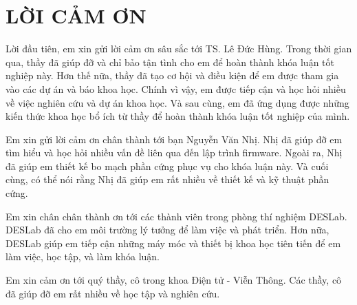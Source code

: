 \chapter*{LỜI CẢM ƠN}
\label{thanks}

Lời đầu tiên, em xin gửi lời cảm ơn sâu sắc tới TS. Lê Đức Hùng. Trong thời gian qua, thầy đã giúp đỡ và chỉ bảo tận tình cho em để hoàn thành khóa luận tốt nghiệp này. Hơn thế nữa, thầy đã tạo cơ hội và điều kiện để em được tham gia vào các dự án và báo khoa học. Chính vì vậy, em được tiếp cận và học hỏi nhiều về việc nghiên cứu và dự án khoa học. Và sau cùng, em đã ứng dụng được những kiến thức khoa học bổ ích từ thầy để hoàn thành khóa luận tốt nghiệp của mình.

Em xin gửi lời cảm ơn chân thành tới bạn Nguyễn Văn Nhị. Nhị đã giúp đỡ em tìm hiểu và học hỏi nhiều vấn đề liên qua đến lập trình firmware. Ngoài ra, Nhị đã giúp em thiết kế bo mạch phần cứng phục vụ cho khóa luận này. Và cuối cùng, có thể nói rằng Nhị đã giúp em rất nhiều về thiết kế và kỹ thuật phần cứng.

Em xin chân chân thành ơn tới các thành viên trong phòng thí nghiệm DESLab. DESLab đã cho em môi trường lý tưởng để làm việc và phát triển. Hơn nữa, DESLab giúp em tiếp cận những máy móc và thiết bị khoa học tiên tiến để em làm việc, học tập, và làm khóa luận.

Em xin cảm ơn tới quý thầy, cô trong khoa Điện tử - Viễn Thông. Các thầy, cô đã giúp đỡ em rất nhiều về học tập và nghiên cứu.